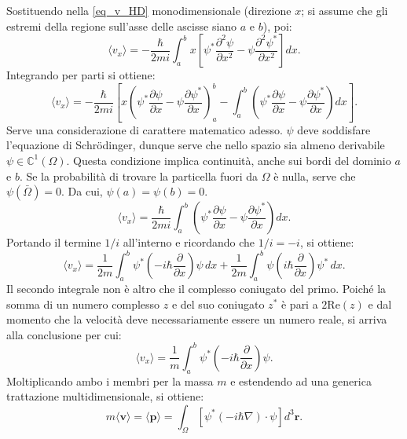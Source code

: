 \documentclass[a4paper,11pt]{report}
\begin{document}
Sostituendo nella \eqref{eq_v_HD} monodimensionale (direzione $x$; si assume che gli estremi della regione sull'asse delle ascisse siano $a$ e $b$), poi:
\begin{equation}
\langle {{v}_x} \rangle = -\frac{\hbar}{2mi}\int_a^{b} x\left[ \psi^*\frac{\partial^2\psi}{\partial x^2}- \psi\frac{\partial^2\psi^*}{\partial x^2} \right] dx.
\end{equation}
Integrando per parti si ottiene:
\begin{equation}
\langle {{v}_x} \rangle = -\frac{\hbar}{2mi} \left[x\left( \psi^*\frac{\partial \psi}{\partial x}- \psi\frac{\partial\psi^*}{\partial x} \right)_{a}^{b} - \int_a^b \left( \psi^*\frac{\partial \psi}{\partial x}- \psi\frac{\partial\psi^*}{\partial x} \right)dx\right ].
\end{equation}
Serve una considerazione di carattere matematico adesso. $\psi$ deve soddisfare l'equazione di Schrödinger, dunque serve che nello spazio sia almeno derivabile $\psi \in \mathbb{C}^1(\Omega)$. Questa condizione implica continuità, anche sui bordi del dominio $a$ e $b$. Se la probabilità di trovare la particella fuori da $\Omega$ è nulla, serve che $\psi(\bar{\Omega}) = 0$. Da cui, $\psi(a) = \psi(b) = 0$. 
\begin{equation}
\langle {{v}_x} \rangle = \frac{\hbar}{2mi} \int_a^b \left( \psi^*\frac{\partial \psi}{\partial x}- \psi\frac{\partial\psi^*}{\partial x} \right)dx.
\end{equation}
Portando il termine $1/i$ all'interno e ricordando che $1/i = -i$, si ottiene:
\begin{equation}
    \langle v_x \rangle = \frac{1}{2m} \int_a^b \psi^* \left( -i\hbar \frac{\partial}{\partial x} \right) \psi \, dx + \frac{1}{2m} \int_a^b \psi \left( i\hbar \frac{\partial}{\partial x} \right) \psi^* \, dx.
\end{equation}
Il secondo integrale non è altro che il complesso coniugato del primo. Poiché la somma di un numero complesso $z$ e del suo coniugato $z^*$ è pari a $2\text{Re}(z)$ e dal momento che la velocità deve necessariamente essere un numero reale, si arriva alla conclusione per cui:
\begin{equation}
    \langle v_x \rangle = \frac{1}{m} \int_a^b \psi^* \left( -i\hbar \frac{\partial}{\partial x} \right) \psi.
\end{equation}
Moltiplicando ambo i membri per la massa $m$ e estendendo ad una generica trattazione multidimensionale, si ottiene:
\begin{equation}
    m\langle \bm{v} \rangle =\langle \bm{p} \rangle =  \int_\Omega [\psi^* ( -i\hbar \nabla) \cdot \psi] d^3\bm{r}.
    \label{eq_p_q}
\end{equation}
\end{document}
